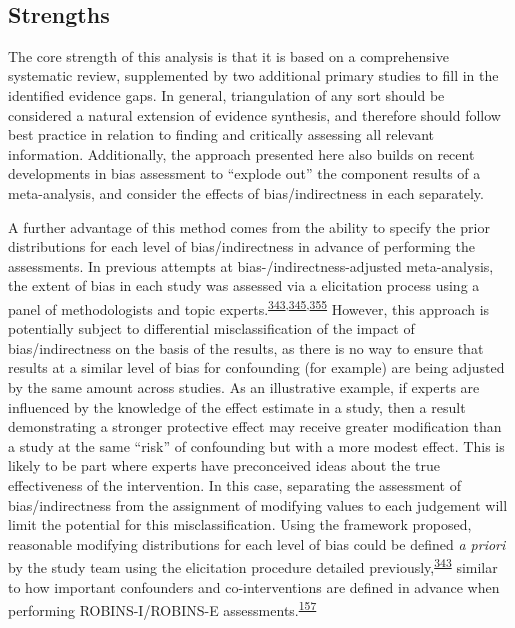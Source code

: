 \documentclass[a4paper, twoside]{templates/ociamthesis}
\begin{document}
~

\hypertarget{strengths-2}{%
\subsection{Strengths}\label{strengths-2}}

The core strength of this analysis is that it is based on a comprehensive systematic review, supplemented by two additional primary studies to fill in the identified evidence gaps. In general, triangulation of any sort should be considered a natural extension of evidence synthesis, and therefore should follow best practice in relation to finding and critically assessing all relevant information. Additionally, the approach presented here also builds on recent developments in bias assessment to ``explode out'' the component results of a meta-analysis, and consider the effects of bias/indirectness in each separately.

A further advantage of this method comes from the ability to specify the prior distributions for each level of bias/indirectness in advance of performing the assessments. In previous attempts at bias-/indirectness-adjusted meta-analysis, the extent of bias in each study was assessed via a elicitation process using a panel of methodologists and topic experts.\textsuperscript{\protect\hyperlink{ref-turner2009}{343},\protect\hyperlink{ref-thompson2011}{345},\protect\hyperlink{ref-wilks2011}{355}} However, this approach is potentially subject to differential misclassification of the impact of bias/indirectness on the basis of the results, as there is no way to ensure that results at a similar level of bias for confounding (for example) are being adjusted by the same amount across studies. As an illustrative example, if experts are influenced by the knowledge of the effect estimate in a study, then a result demonstrating a stronger protective effect may receive greater modification than a study at the same ``risk'' of confounding but with a more modest effect. This is likely to be part where experts have preconceived ideas about the true effectiveness of the intervention. In this case, separating the assessment of bias/indirectness from the assignment of modifying values to each judgement will limit the potential for this misclassification. Using the framework proposed, reasonable modifying distributions for each level of bias could be defined \emph{a priori} by the study team using the elicitation procedure detailed previously,\textsuperscript{\protect\hyperlink{ref-turner2009}{343}} similar to how important confounders and co-interventions are defined in advance when performing ROBINS-I/ROBINS-E assessments.\textsuperscript{\protect\hyperlink{ref-sterne2016}{157}}
\end{document}
